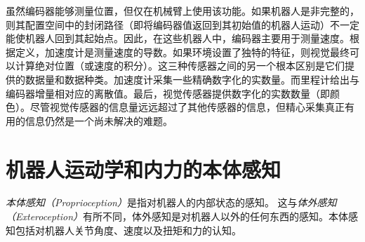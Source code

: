 
虽然编码器能够测量位置，但仅在机械臂上使用该功能。如果机器人是非完整的，则其配置空间中的封闭路径（即将编码器值返回到其初始值的机器人运动）不一定能使机器人回到其起始点。因此，在这些机器人中，编码器主要用于测量速度。根据定义，加速度计是测量速度的导数。如果环境设置了独特的特征，则视觉最终可以计算绝对位置（或速度的积分）。这三种传感器之间的另一个根本区别是它们提供的数据量和数据种类。加速度计采集一些精确数字化的实数量。而里程计给出与编码器增量相对应的离散值。最后，视觉传感器提供数字化的实数数量（即颜色）。尽管视觉传感器的信息量远远超过了其他传感器的信息，但精心采集真正有用的信息仍然是一个尚未解决的难题。


\section{机器人运动学和内力的本体感知}
\emph{本体感知（Proprioception）}是指对机器人的内部状态的感知。
这与\emph{体外感知（Exteroception）}有所不同，体外感知是对机器人以外的任何东西的感知。本体感知包括对机器人关节角度、速度以及扭矩和力的认知。

